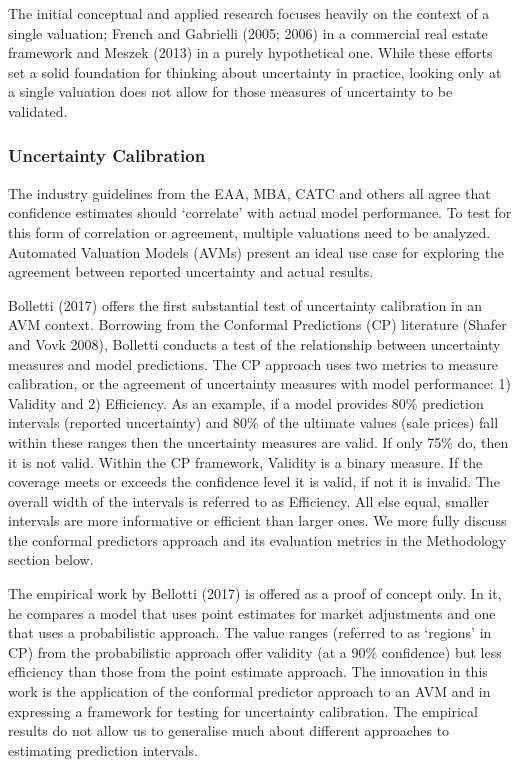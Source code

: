 \documentclass[colTwo]{format}
\theoremstyle{definition}
\begin{document}
The initial conceptual and applied research focuses heavily on the context of a single valuation; French and Gabrielli (2005; 2006) in a commercial real estate framework and Meszek (2013) in a purely hypothetical one. While these efforts set a solid foundation for thinking about uncertainty in practice, looking only at a single valuation does not allow for those measures of uncertainty to be validated. 

\subsubsection{Uncertainty Calibration}

The industry guidelines from the EAA, MBA, CATC and others all agree that confidence estimates should ‘correlate’ with actual model performance.  To test for this form of correlation or agreement, multiple valuations need to be analyzed.  Automated Valuation Models (AVMs) present an ideal use case for exploring the agreement between reported uncertainty and actual results.  

Bolletti (2017) offers the first substantial test of uncertainty calibration in an AVM context.  Borrowing from the Conformal Predictions (CP) literature (Shafer and Vovk 2008), Bolletti conducts a test of the relationship between uncertainty measures and model predictions. The CP approach uses two metrics to measure calibration, or the agreement of uncertainty measures with model performance: 1) Validity and 2) Efficiency.  As an example, if a model provides 80\% prediction intervals (reported uncertainty) and 80\% of the ultimate values (sale prices) fall within these ranges then the uncertainty measures are valid.  If only 75\% do, then it is not valid. Within the CP framework, Validity is a binary measure.  If the coverage meets or exceeds the confidence level it is valid, if not it is invalid. The overall width of the intervals is referred to as Efficiency.  All else equal, smaller intervals are more informative or efficient than larger ones.  We more fully discuss the conformal predictors approach and its evaluation metrics in the Methodology section below. 

The empirical work by Bellotti (2017) is offered as a proof of concept only.  In it, he compares a model that uses point estimates for market adjustments and one that uses a probabilistic approach.  The value ranges (referred to as ‘regions’ in CP) from the probabilistic approach offer validity (at a 90\% confidence) but less efficiency than those from the point estimate approach.  The innovation in this work is the application of the conformal predictor approach to an AVM and in expressing a framework for testing for uncertainty calibration.  The empirical results do not allow us to generalise much about different approaches to estimating prediction intervals.   
\end{document}
